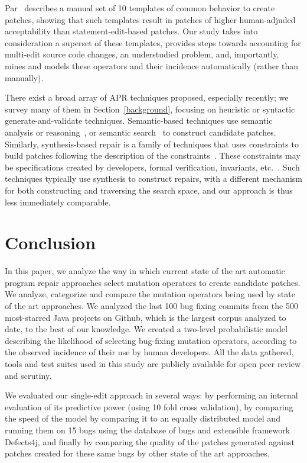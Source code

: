 \documentclass[conference]{IEEEtran}
\begin{document}
Par~\cite{kim2013} describes a manual set of 10 templates of common behavior to
create patches, showing that such templates result in patches of higher
human-adjuded acceptability than statement-edit-based patches.  Our study takes 
into consideration a superset
of these templates, provides steps towards
accounting for multi-edit source code changes, an understudied problem, and,
importantly, mines and models these operators and their incidence automatically
(rather than manually).

There exist a broad array of APR techniques proposed, especially recently; we
survey many of them in Section~\ref{background}, focusing on heuristic or
syntactic generate-and-validate techniques.  Semantic-based techniques use
semantic analysis or reasoning~\cite{nguyen13,mechtaev15,Mechtaev2016}, or
semantic search~\cite{ke15} to construct candidate patches.  Similarly,
synthesis-based repair is a family of techniques that uses constraints to build
patches following the description of the constraints~\cite{jin11,wei10}. These constraints may be
specifications created by developers, formal verification, invariants,
etc.~\cite{jin11,wei10}.  Such techniques typically use synthesis to construct
repairs, with a different mechanism for both constructing and traversing the
search space, and our approach is thus less immediately comparable.
 

\section{Conclusion} \label{conclusion}

In this paper, we analyze the way in which current state of the art automatic 
program repair approaches select mutation operators to create candidate 
patches. We analyze, categorize and compare the mutation operators being used by 
state of the art approaches. We analyzed the last 100 bug fixing commits from 
the
500 most-starred Java projects on Github, which is the largest corpus analyzed
to date, to the best of our knowledge.  We created a two-level probabilistic 
model describing
the likelihood of selecting bug-fixing mutation operators, according to the
observed incidence of their use by human developers. All the data gathered, 
tools and test suites used in this study are publicly available for open peer review 
and scrutiny.

We evaluated our single-edit approach in several ways: by performing an internal 
evaluation of 
its predictive power (using 10 fold cross 
validation), by comparing the speed of the model by comparing it to an equally 
distributed model and  
 running them on 15 bugs using the database of bugs and extensible 
framework Defects4j, and finally by comparing the quality of the patches 
generated against patches created for these same bugs by other state of the art 
approaches. 
\end{document}
